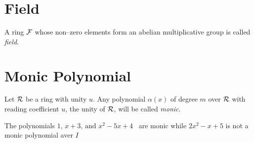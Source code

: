 \documentclass[a4paper]{article}
\theoremstyle{plain} %
{\theorembodyfont{\normalfont}
\newtheorem{Exa}{Example}}
\begin{document}
\section{Field}
A ring $\cal F$ whose non--zero elements form an abelian
multiplicative group is called {\em field}. \cite[p.118]{algebra1}

\section{Monic Polynomial}
Let $\cal R$ be a ring with unity $u$. Any polynomial $\alpha(x)$
of degree $m$ over $\cal R$ with reading coefficient $u$, the
unity of $\cal R$, will be called {\em
monic}.\cite[p.126]{algebra1}
\begin{Exa}
 The polynomials $1,\, x+3 ,\, \text{and~} x^2-5x+4$ ~are monic
 while $2x^2-x+5$ is not a monic polynomial aver $I$
\end{Exa}

\vspace{4\baselineskip}



\end{document}
